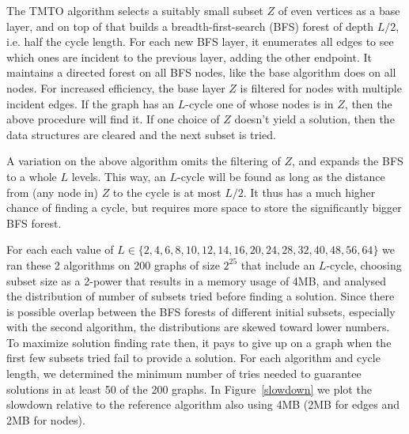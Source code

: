 \documentclass{beamer}
\begin{document}
The TMTO algorithm selects a suitably small subset $Z$ of even vertices as a base layer,
and on top of that builds a breadth-first-search
(BFS) forest of depth $L/2$, i.e. half the cycle length.
For each new BFS layer, it enumerates all edges to see which ones are incident
to the previous layer, adding the other endpoint.
It maintains a directed forest on all BFS nodes, like the base algorithm does on all nodes.
For increased efficiency, the base layer $Z$ is filtered for nodes with multiple incident edges.
If the graph has an $L$-cycle one of whose nodes is in $Z$, then the above procedure will find it.
If one choice of $Z$ doesn't yield a solution, then the data structures are cleared and the next
subset is tried.

A variation on the above algorithm omits the filtering of $Z$, and expands
the BFS to a whole $L$ levels. This way, an $L$-cycle will be found as long as the distance from (any node in)
$Z$ to the cycle is at most $L/2$. It thus has a much higher chance of finding a cycle, but requires
more space to store the significantly bigger BFS forest.

For each each value of $L \in \{2,4,6,8,10,12,14,16,20,24,28,32,40,48,56,64\}$ we ran these 2 algorithms
on 200 graphs of size $2^{25}$ that include an $L$-cycle,
choosing subset size as a 2-power that results in a memory usage of 4MB,
and analysed the distribution of number of subsets tried before
finding a solution. Since there is possible overlap between the BFS forests of different initial subsets,
especially with the second algorithm, the distributions are skewed toward lower numbers. To maximize solution
finding rate then, it pays to give up on a graph when the first few subsets tried fail to provide a solution.
For each algorithm and cycle length, we determined the minimum number of tries needed to guarantee solutions
in at least 50 of the 200 graphs. In Figure~\ref{slowdown} we plot the slowdown relative
to the reference algorithm also using 4MB (2MB for edges and 2MB for nodes).
\end{document}
